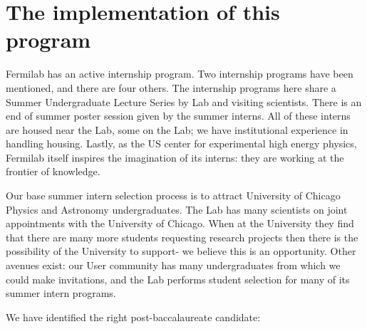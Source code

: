\newpage
\section{The implementation of this program}

Fermilab has an active internship program. Two internship programs
have been mentioned, and there are four others. The internship
programs here share a Summer Undergraduate Lecture Series by
Lab and visiting scientists. There is an end of summer poster
session given by the summer interns. All of these interns
are housed near the Lab, some on the Lab; we have institutional
experience in handling housing. Lastly, as the US center for
experimental high energy physics, Fermilab itself inspires
the imagination of its interns: they are working at the frontier
of knowledge.

Our base summer intern selection process is to attract
University of Chicago Physics and Astronomy undergraduates.
The Lab has many scientists on joint appointments with
the University of Chicago. When at the University they find
that there are  many more students
requesting research projects then there is the possibility of
the University to support- we believe this is an opportunity.
Other avenues exist: our User community has many undergraduates
from which we could make invitations, 
and the Lab performs student selection for many of its summer
intern programs.

We have identified the right post-baccalaureate candidate:



